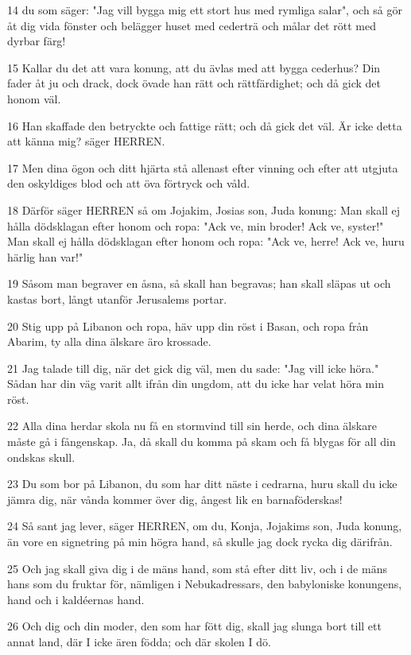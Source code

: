 \par 14 du som säger: "Jag vill bygga mig ett stort hus med rymliga salar", och så gör åt dig vida fönster och belägger huset med cederträ och målar det rött med dyrbar färg!
\par 15 Kallar du det att vara konung, att du ävlas med att bygga cederhus? Din fader åt ju och drack, dock övade han rätt och rättfärdighet; och då gick det honom väl.
\par 16 Han skaffade den betryckte och fattige rätt; och då gick det väl. Är icke detta att känna mig? säger HERREN.
\par 17 Men dina ögon och ditt hjärta stå allenast efter vinning och efter att utgjuta den oskyldiges blod och att öva förtryck och våld.
\par 18 Därför säger HERREN så om Jojakim, Josias son, Juda konung: Man skall ej hålla dödsklagan efter honom och ropa: "Ack ve, min broder! Ack ve, syster!" Man skall ej hålla dödsklagan efter honom och ropa: "Ack ve, herre! Ack ve, huru härlig han var!"
\par 19 Såsom man begraver en åsna, så skall han begravas; han skall släpas ut och kastas bort, långt utanför Jerusalems portar.
\par 20 Stig upp på Libanon och ropa, häv upp din röst i Basan, och ropa från Abarim, ty alla dina älskare äro krossade.
\par 21 Jag talade till dig, när det gick dig väl, men du sade: "Jag vill icke höra." Sådan har din väg varit allt ifrån din ungdom, att du icke har velat höra min röst.
\par 22 Alla dina herdar skola nu få en stormvind till sin herde, och dina älskare måste gå i fångenskap. Ja, då skall du komma på skam och få blygas för all din ondskas skull.
\par 23 Du som bor på Libanon, du som har ditt näste i cedrarna, huru skall du icke jämra dig, när vånda kommer över dig, ångest lik en barnaföderskas!
\par 24 Så sant jag lever, säger HERREN, om du, Konja, Jojakims son, Juda konung, än vore en signetring på min högra hand, så skulle jag dock rycka dig därifrån.
\par 25 Och jag skall giva dig i de mäns hand, som stå efter ditt liv, och i de mäns hans som du fruktar för, nämligen i Nebukadressars, den babyloniske konungens, hand och i kaldéernas hand.
\par 26 Och dig och din moder, den som har fött dig, skall jag slunga bort till ett annat land, där I icke ären födda; och där skolen I dö.
